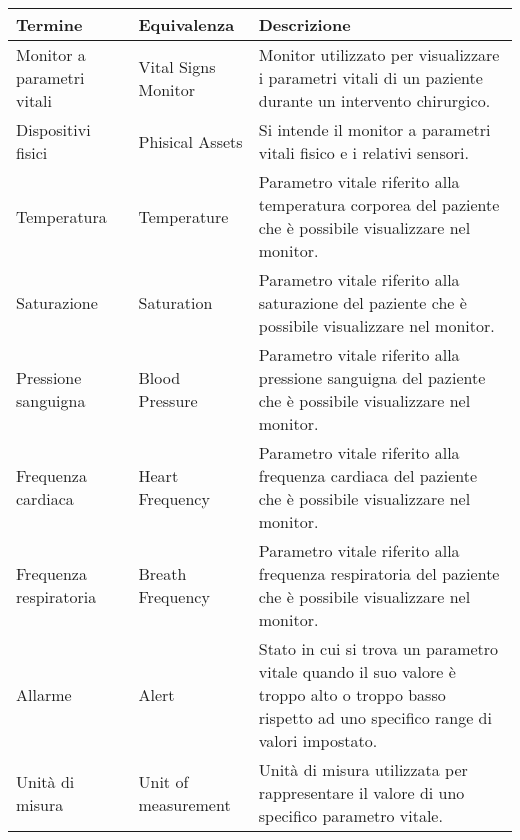 \bgroup
\def\arraystretch{1.5}
\begin{table}[H]
    \begin{tabular}{ |m{3cm}|m{3cm}|m{5cm}| } 
        \hline
        \textbf{Termine} & \textbf{Equivalenza} & \textbf{Descrizione}
        \\\hline
        Monitor a parametri vitali & Vital Signs Monitor & Monitor utilizzato per visualizzare i parametri vitali di un paziente durante un intervento chirurgico.
        \\\hline
        Dispositivi fisici &  Phisical Assets & Si intende il monitor a parametri vitali fisico e i relativi sensori.
        \\\hline
        Temperatura & Temperature & Parametro vitale riferito alla temperatura corporea del paziente che è possibile visualizzare nel monitor.
        \\\hline
        Saturazione & Saturation & Parametro vitale riferito alla saturazione del paziente che è possibile visualizzare nel monitor.
        \\\hline
        Pressione sanguigna & Blood Pressure & Parametro vitale riferito alla pressione sanguigna del paziente che è possibile visualizzare nel monitor.
        \\\hline
        Frequenza cardiaca & Heart Frequency & Parametro vitale riferito alla frequenza cardiaca  del paziente che è possibile visualizzare nel monitor.
        \\\hline
        Frequenza respiratoria & Breath Frequency  & Parametro vitale riferito alla frequenza respiratoria del paziente che è possibile visualizzare nel monitor.
        \\\hline
        Allarme &  Alert & Stato in cui si trova un parametro vitale quando il suo valore è troppo alto o troppo basso rispetto ad uno specifico range di valori impostato.
        \\\hline
        Unità di misura & Unit of measurement & Unità di misura utilizzata per rappresentare il valore di uno specifico parametro vitale.
        \\\hline
    \end{tabular}
\end{table}
\egroup


